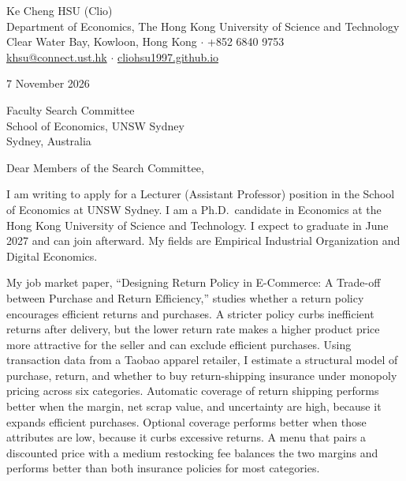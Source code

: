 \documentclass[11pt]{article}
\begin{document}
\begin{flushleft}
Ke Cheng HSU (Clio) \\
Department of Economics, The Hong Kong University of Science and Technology \\
Clear Water Bay, Kowloon, Hong Kong $\cdot$ +852 6840 9753 \\
\href{mailto:khsu@connect.ust.hk}{khsu@connect.ust.hk} $\cdot$ \href{https://cliohsu1997.github.io/}{cliohsu1997.github.io}
\end{flushleft}

7 November 2026

\vspace{0.15em}
Faculty Search Committee \\
School of Economics, UNSW Sydney \\
Sydney, Australia

\vspace{0.15em}
Dear Members of the Search Committee,

I am writing to apply for a Lecturer (Assistant Professor) position in the School of Economics at UNSW Sydney. I am a Ph.D.\ candidate in Economics at the Hong Kong University of Science and Technology. I expect to graduate in June 2027 and can join afterward. My fields are Empirical Industrial Organization and Digital Economics.

My job market paper, ``Designing Return Policy in E-Commerce: A Trade-off between Purchase and Return Efficiency,'' studies whether a return policy encourages efficient returns and purchases. A stricter policy curbs inefficient returns after delivery, but the lower return rate makes a higher product price more attractive for the seller and can exclude efficient purchases. Using transaction data from a Taobao apparel retailer, I estimate a structural model of purchase, return, and whether to buy return-shipping insurance under monopoly pricing across six categories. Automatic coverage of return shipping performs better when the margin, net scrap value, and uncertainty are high, because it expands efficient purchases. Optional coverage performs better when those attributes are low, because it curbs excessive returns. A menu that pairs a discounted price with a medium restocking fee balances the two margins and performs better than both insurance policies for most categories.
\end{document}
